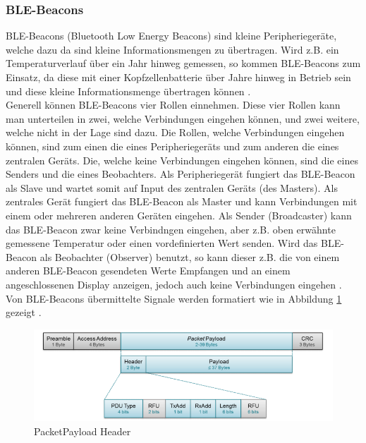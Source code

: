 \subsubsection{BLE-Beacons}
BLE-Beacons (Bluetooth Low Energy Beacons) sind kleine Peripheriegeräte, welche dazu da sind kleine Informationsmengen zu übertragen. Wird z.B. ein Temperaturverlauf über ein Jahr hinweg gemessen, so kommen BLE-Beacons zum Einsatz, da diese mit einer Kopfzellenbatterie über Jahre hinweg in Betrieb sein und diese kleine Informationsmenge übertragen können \cite{9_Teildokument_BT}.\\[0.25cm]
Generell können BLE-Beacons vier Rollen einnehmen. Diese vier Rollen kann man unterteilen in zwei, welche Verbindungen eingehen können, und zwei weitere, welche nicht in der Lage sind dazu. Die Rollen, welche Verbindungen eingehen können, sind zum einen die eines Peripheriegeräts und zum anderen die eines zentralen Geräts. Die, welche keine Verbindungen eingehen können, sind die eines Senders und die eines Beobachters. Als Peripheriegerät fungiert das BLE-Beacon als Slave und wartet somit auf Input des zentralen Geräts (des Masters). Als zentrales Gerät fungiert das BLE-Beacon als Master und kann Verbindungen mit einem oder mehreren anderen Geräten eingehen. Als Sender (Broadcaster) kann das BLE-Beacon zwar keine Verbindngen eingehen, aber z.B. oben erwähnte gemessene Temperatur oder einen vordefinierten Wert senden. Wird das BLE-Beacon als Beobachter (Observer) benutzt, so kann dieser z.B. die von einem anderen BLE-Beacon gesendeten Werte Empfangen und an einem angeschlossenen Display anzeigen, jedoch auch keine Verbindungen eingehen \cite{9_Teildokument_BT}.\\[0.25cm]
Von BLE-Beacons übermittelte Signale werden formatiert wie in Abbildung \ref{fig:PacketPayload_Header} gezeigt \cite{9_Teildokument_BT}.\\
\begin{figure}[H]
	\begin{center}
		\includegraphics[width=120mm]{data/PacketPayload_Header.png}
		\caption[PacketPayload Header]{PacketPayload Header} %
		\label{fig:PacketPayload_Header}
	\end{center}
\end{figure}
